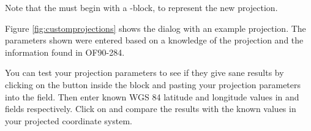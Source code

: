 Note that the  must begin with a -block,
to represent the new projection.

Figure \ref{fig:customprojections} shows
the dialog with an example projection. The parameters shown were entered based
on a knowledge of the projection and the information found in OF90-284.

You can test your projection parameters to see if they give sane results by
clicking on the  button inside the  block 
and pasting your projection parameters into
the  field. Then enter known WGS 84 latitude and longitude
values in  and  fields respectively. 
Click on  and compare the results with the known values in your projected coordinate
system. 

